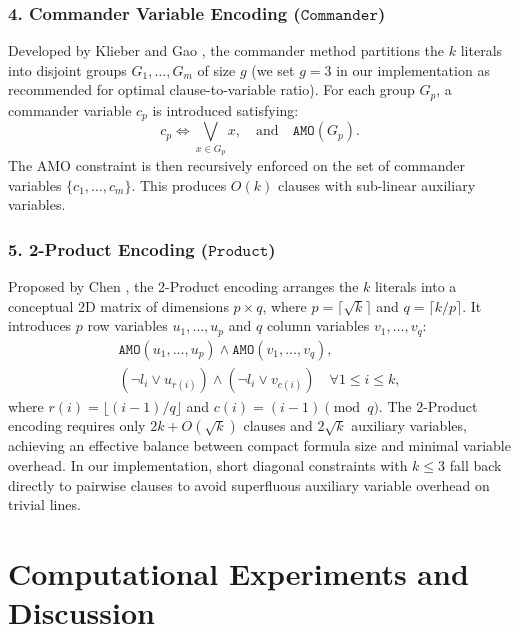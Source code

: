 \documentclass[a4paper,fleqn]{cas-sc}
\begin{document}
\subsubsection{4. Commander Variable Encoding ($\mathtt{Commander}$)}
Developed by Klieber and Gao \citep{klieber2007commander}, the commander method partitions the $k$ literals into disjoint groups $G_1, \dots, G_m$ of size $g$ (we set $g=3$ in our implementation as recommended for optimal clause-to-variable ratio). For each group $G_p$, a commander variable $c_p$ is introduced satisfying:
\begin{equation}
    c_p \iff \bigvee_{x \in G_p} x, \quad \text{and} \quad \mathtt{AMO}(G_p).
\end{equation}
The AMO constraint is then recursively enforced on the set of commander variables $\{c_1, \dots, c_m\}$. This produces $O(k)$ clauses with sub-linear auxiliary variables.

\subsubsection{5. 2-Product Encoding ($\mathtt{Product}$)}
Proposed by Chen \citep{chen2010two}, the 2-Product encoding arranges the $k$ literals into a conceptual 2D matrix of dimensions $p \times q$, where $p = \lceil \sqrt{k} \rceil$ and $q = \lceil k/p \rceil$. It introduces $p$ row variables $u_1, \dots, u_p$ and $q$ column variables $v_1, \dots, v_q$:
\begin{align}
    \mathtt{AMO}(u_1, \dots, u_p) \land \mathtt{AMO}(v_1, \dots, v_q), \\
    (\neg l_i \lor u_{r(i)}) \land (\neg l_i \lor v_{c(i)}) \quad \forall 1 \le i \le k,
\end{align}
where $r(i) = \lfloor (i-1)/q \rfloor$ and $c(i) = (i-1) \pmod q$. The 2-Product encoding requires only $2k + O(\sqrt{k})$ clauses and $2\sqrt{k}$ auxiliary variables, achieving an effective balance between compact formula size and minimal variable overhead. In our implementation, short diagonal constraints with $k \le 3$ fall back directly to pairwise clauses to avoid superfluous auxiliary variable overhead on trivial lines.

\section{Computational Experiments and Discussion}
\label{sec:experiments}
\end{document}
